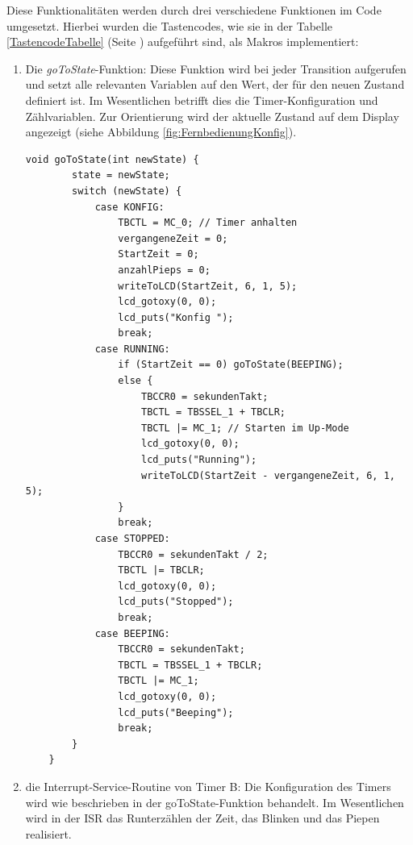 \documentclass[12pt,a4paper,bibliography=totocnumbered,listof=totocnumbered]{scrartcl}
\begin{document}
Diese Funktionalitäten werden durch drei verschiedene Funktionen im Code umgesetzt. Hierbei wurden die Tastencodes, wie sie in der Tabelle \ref{TastencodeTabelle} (Seite \pageref{TastencodeTabelle}) aufgeführt sind, als Makros implementiert:

\begin{enumerate}
	\item Die \textit{goToState}-Funktion: \newline
	Diese Funktion wird bei jeder Transition aufgerufen und setzt alle relevanten Variablen auf den Wert, der für den neuen Zustand definiert ist. Im Wesentlichen betrifft dies die Timer-Konfiguration und Zählvariablen. Zur Orientierung wird der aktuelle Zustand auf dem Display angezeigt (siehe Abbildung \ref{fig:FernbedienungKonfig}).
	
	\vspace{1em}
	\begin{lstlisting}[caption=die goToState-Funktion]
	void goToState(int newState) {
		state = newState;
		switch (newState) {
			case KONFIG:
				TBCTL = MC_0; // Timer anhalten
				vergangeneZeit = 0;
				StartZeit = 0;
				anzahlPieps = 0;
				writeToLCD(StartZeit, 6, 1, 5);
				lcd_gotoxy(0, 0);
				lcd_puts("Konfig ");
				break;
			case RUNNING:
				if (StartZeit == 0) goToState(BEEPING);
				else {
					TBCCR0 = sekundenTakt;
					TBCTL = TBSSEL_1 + TBCLR;
					TBCTL |= MC_1; // Starten im Up-Mode
					lcd_gotoxy(0, 0);
					lcd_puts("Running");
					writeToLCD(StartZeit - vergangeneZeit, 6, 1, 5);
				}
				break;
			case STOPPED:
				TBCCR0 = sekundenTakt / 2;
				TBCTL |= TBCLR;
				lcd_gotoxy(0, 0);
				lcd_puts("Stopped");
				break;
			case BEEPING:
				TBCCR0 = sekundenTakt;
				TBCTL = TBSSEL_1 + TBCLR;
				TBCTL |= MC_1;
				lcd_gotoxy(0, 0);
				lcd_puts("Beeping");
				break;
		}
	}
	\end{lstlisting}
	
	\item die Interrupt-Service-Routine von Timer B: \newline
	Die Konfiguration des Timers wird wie beschrieben in der goToState-Funktion behandelt. Im Wesentlichen wird in der ISR das Runterzählen der Zeit, das Blinken und das Piepen realisiert.
	

\end{enumerate}
\end{document}
